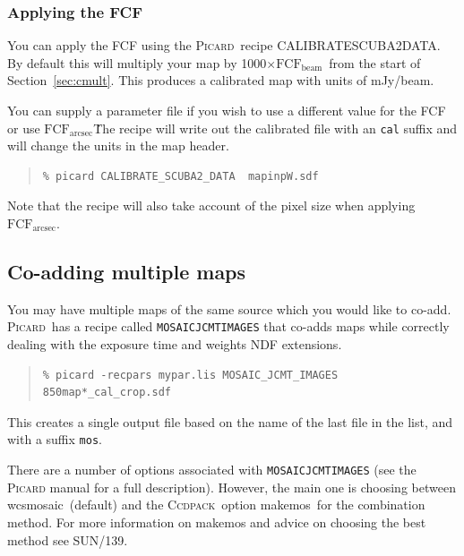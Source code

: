 \documentclass[twoside,11pt]{article}
\newcommand{\htmlref}[2]{#1}
\newcommand{\latexhtml}[2]{#1}
\newcommand{\xref}[3]{#1}
\newcommand{\xlabel}[1]{}
\renewcommand{\_}{\texttt{\symbol{95}}}
\newenvironment{myquote}{\begin{quote}\begin{small}}{\end{small}\end{quote}}
\newcommand{\fcfb}{$\mathrm{FCF_{beam}}$}
\newcommand{\fcfa}{$\mathrm{FCF_{arcsec}}$}
\newcommand{\ccdpack}{\xref{\textsc{Ccdpack}}{sun139}{}}
\newcommand{\picard}{\xref{\textsc{Picard}}{sun265}{}}
\newcommand{\drrecipe}[1]{\texttt{#1}}
\newcommand{\task}[1]{\textsf{#1}}
\newcommand{\param}[1]{\texttt{#1}}
\newcommand{\wcsmosaic}{\xref{\task{wcsmosaic}}{sun95}{WCSMOSAIC}}
\newcommand{\makemos}{\xref{\task{makemos}}{sun139}{MAKEMOS}}
\newcommand{\cref}[3]{\latexhtml{#1~\ref{#2}}{\htmlref{#3}{#2}}}
\begin{document}
\subsubsection{Applying the FCF}

You can apply the FCF using the \picard\ recipe
CALIBRATE\_SCUBA2\_DATA. By default this will multiply your map by
1000$\times$\fcfb\ from the start of
\cref{Section}{sec:cmult}{Flux Conversion Factors}. This produces a
calibrated map with units of mJy/beam.

You can supply a parameter file if you wish to use a different value
for the FCF or use \fcfa\. The recipe will write out the calibrated
file with an \texttt{\_cal} suffix and will change the units in the
map header.

\begin{myquote}
\begin{verbatim}
% picard CALIBRATE_SCUBA2_DATA  mapinpW.sdf
\end{verbatim}
\end{myquote}
Note that the recipe will also take account of the pixel size when
applying \fcfa.


\subsection{\xlabel{coadd}Co-adding multiple maps}
\label{sec:coadd}

You may have multiple maps of the same source which you would like to
co-add. \picard\ has a recipe called
\xref{\drrecipe{MOSAIC\_JCMT\_IMAGES}}{sun265}{MOSAIC_JCMT_IMAGES}
that co-adds maps while correctly dealing with the exposure time and
weights NDF extensions.
\begin{myquote}
\begin{verbatim}
% picard -recpars mypar.lis MOSAIC_JCMT_IMAGES 850map*_cal_crop.sdf
\end{verbatim}
\end{myquote}
This creates a single output file based on the name of the last file
in the list, and with a suffix \texttt{\_mos}.

There are a number of options associated with
\param{MOSAIC\_JCMT\_IMAGES} (see the \textsc{Picard} manual for a full
description). However, the main one is choosing between \wcsmosaic\
(default) and the \ccdpack\ option \makemos\ for the combination
method. For more information on \task{makemos} and advice on choosing the
best method see \xref{SUN/139}{sun139}{}.
\end{document}
